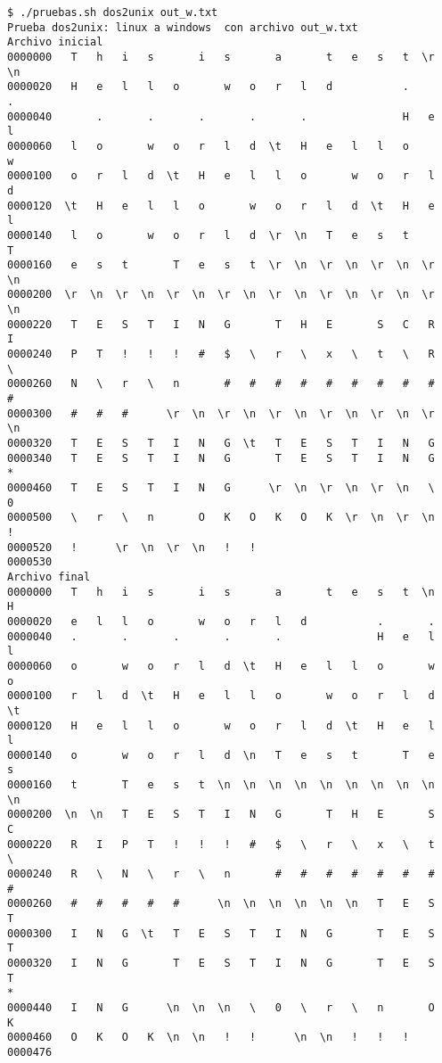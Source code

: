 \documentclass[titlepage,a4paper]{article}
\begin{document}
\begin{lstlisting}
$ ./pruebas.sh dos2unix out_w.txt 
Prueba dos2unix: linux a windows  con archivo out_w.txt
Archivo inicial
0000000   T   h   i   s       i   s       a       t   e   s   t  \r  \n
0000020   H   e   l   l   o       w   o   r   l   d           .       .
0000040       .       .       .       .       .               H   e   l
0000060   l   o       w   o   r   l   d  \t   H   e   l   l   o       w
0000100   o   r   l   d  \t   H   e   l   l   o       w   o   r   l   d
0000120  \t   H   e   l   l   o       w   o   r   l   d  \t   H   e   l
0000140   l   o       w   o   r   l   d  \r  \n   T   e   s   t       T
0000160   e   s   t       T   e   s   t  \r  \n  \r  \n  \r  \n  \r  \n
0000200  \r  \n  \r  \n  \r  \n  \r  \n  \r  \n  \r  \n  \r  \n  \r  \n
0000220   T   E   S   T   I   N   G       T   H   E       S   C   R   I
0000240   P   T   !   !   !   #   $   \   r   \   x   \   t   \   R   \
0000260   N   \   r   \   n       #   #   #   #   #   #   #   #   #   #
0000300   #   #   #      \r  \n  \r  \n  \r  \n  \r  \n  \r  \n  \r  \n
0000320   T   E   S   T   I   N   G  \t   T   E   S   T   I   N   G    
0000340   T   E   S   T   I   N   G       T   E   S   T   I   N   G    
*
0000460   T   E   S   T   I   N   G      \r  \n  \r  \n  \r  \n   \   0
0000500   \   r   \   n       O   K   O   K   O   K  \r  \n  \r  \n   !
0000520   !      \r  \n  \r  \n   !   !
0000530
Archivo final
0000000   T   h   i   s       i   s       a       t   e   s   t  \n   H
0000020   e   l   l   o       w   o   r   l   d           .       .    
0000040   .       .       .       .       .               H   e   l   l
0000060   o       w   o   r   l   d  \t   H   e   l   l   o       w   o
0000100   r   l   d  \t   H   e   l   l   o       w   o   r   l   d  \t
0000120   H   e   l   l   o       w   o   r   l   d  \t   H   e   l   l
0000140   o       w   o   r   l   d  \n   T   e   s   t       T   e   s
0000160   t       T   e   s   t  \n  \n  \n  \n  \n  \n  \n  \n  \n  \n
0000200  \n  \n   T   E   S   T   I   N   G       T   H   E       S   C
0000220   R   I   P   T   !   !   !   #   $   \   r   \   x   \   t   \
0000240   R   \   N   \   r   \   n       #   #   #   #   #   #   #   #
0000260   #   #   #   #   #      \n  \n  \n  \n  \n  \n   T   E   S   T
0000300   I   N   G  \t   T   E   S   T   I   N   G       T   E   S   T
0000320   I   N   G       T   E   S   T   I   N   G       T   E   S   T
*
0000440   I   N   G      \n  \n  \n   \   0   \   r   \   n       O   K
0000460   O   K   O   K  \n  \n   !   !      \n  \n   !   !   !
0000476
\end{lstlisting}
\end{document}
